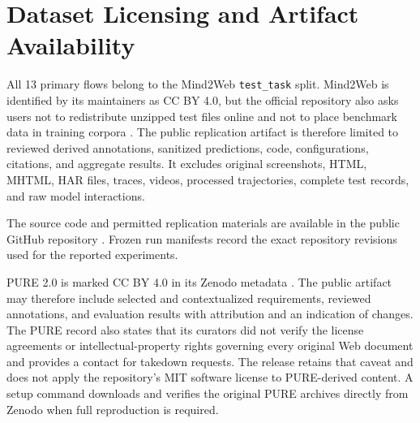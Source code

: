 \clearpage

\section{Dataset Licensing and Artifact Availability}\label{dataset-licensing-and-artifact-availability}

All 13 primary flows belong to the Mind2Web \texttt{test\_task} split. Mind2Web is
identified by its maintainers as CC BY 4.0, but the official repository also
asks users not to redistribute unzipped test files online and not to place
benchmark data in training corpora \autocite{mind2webrepo2023}. The public replication artifact is
therefore limited to reviewed derived annotations, sanitized predictions, code,
configurations, citations, and aggregate results. It excludes original
screenshots, HTML, MHTML, HAR files, traces, videos, processed trajectories,
complete test records, and raw model interactions.

The source code and permitted replication materials are available in the public
GitHub repository \autocite{brueck2026artifact}. Frozen run manifests record the exact
repository revisions used for the reported experiments.

PURE 2.0 is marked CC BY 4.0 in its Zenodo metadata \autocite{purezenodo2018}. The
public artifact may therefore include selected and contextualized requirements, reviewed
annotations, and evaluation results with attribution and an indication of
changes. The PURE record also states that its curators did not verify the
license agreements or intellectual-property rights governing every original
Web document and provides a contact for takedown requests. The release retains
that caveat and does not apply the repository's MIT software license to
PURE-derived content. A setup command downloads and verifies the original PURE
archives directly from Zenodo when full reproduction is required.
